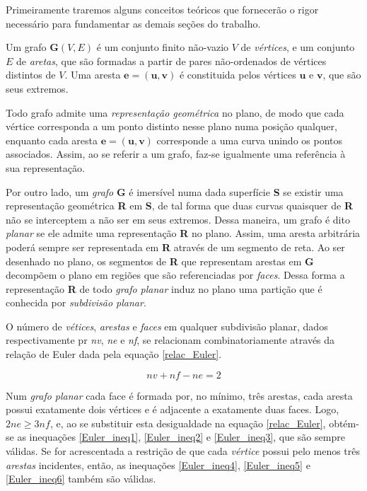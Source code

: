 \documentclass[12pt,a4paper]{book}
\begin{document}
Primeiramente traremos alguns conceitos te\'oricos que fornecer\~ao o rigor necess\'ario para fundamentar as demais se\c{c}\~{o}es do trabalho.

Um grafo ${\mathbf G}(V, E)$ \'e um conjunto finito n\~ao-vazio $V$ de \textit{v\'ertices}, e um conjunto $E$ de \textit{aretas}, que s\~ao formadas a partir de pares n\~ao-ordenados de v\'ertices distintos de $V$. Uma aresta $\mathbf{e}=(\mathbf{u}, \mathbf{v})$ \'e constituida pelos v\'ertices $\mathbf{u}$ e $\mathbf{v}$, que s\~ao seus extremos.

Todo grafo admite uma \textit{representa\c{c}\~{a}o geom\'etrica} no plano, de modo que cada v\'ertice corresponda a um ponto distinto nesse plano numa posi\c{c}\~{a}o qualquer, enquanto cada aresta $\mathbf{e}=(\mathbf{u}, \mathbf{v})$ corresponde a uma curva unindo os pontos associados. Assim, ao se referir a um grafo, faz-se igualmente uma refer\^encia \`a sua representa\c{c}\~{a}o.

Por outro lado, um \textit{grafo} \textbf{G} \'e imers\'ivel numa dada superf\'icie \textbf{S} se existir uma representa\c{c}\~{a}o geom\'etrica \textbf{R} em \textbf{S}, de tal forma que duas curvas quaisquer de \textbf{R} n\~ao se interceptem a n\~ao ser em seus extremos. Dessa maneira, um grafo \'e dito \textit{planar} se ele admite uma representa\c{c}\~{a}o \textbf{R} no plano. Assim, uma aresta arbitr\'aria poder\'a sempre ser representada em \textbf{R} atrav\'es de um segmento de reta. Ao ser desenhado no plano, os segmentos de \textbf{R} que representam arestas em \textbf{G} decomp\~oem o plano em regi\~oes que s\~ao referenciadas por \textit{faces}. Dessa forma a representa\c{c}\~{a}o \textbf{R} de todo \textit{grafo planar} induz no plano  uma parti\c{c}\~{a}o que \'e conhecida por \textit{subdivis\~ao planar}.

O n\'umero de \textit{v\'etices}, \textit{arestas} e \textit{faces} em qualquer subdivis\~ao planar, dados respectivamente pr \textit{nv}, \textit{ne} e \textit{nf}, se relacionam combinatoriamente atrav\'es da rela\c{c}\~{a}o de Euler dada pela equa\c{c}\~{a}o \ref{relac_Euler}.

\begin{equation} \label{relac_Euler}
nv+nf-ne = 2
\end{equation}

Num \textit{grafo planar} cada face \'e formada por, no m\'inimo, tr\^es arestas, cada aresta possui exatamente dois v\'ertices e \'e adjacente a exatamente duas faces. Logo, $2ne\geq 3nf$, e, ao se substituir esta desigualdade na equa\c{c}\~{a}o \ref{relac_Euler}, obt\'em-se as inequa\c{c}\~{o}es \ref{Euler_ineq1}, \ref{Euler_ineq2} e \ref{Euler_ineq3}, que s\~ao sempre v\'alidas. Se for acrescentada a restri\c{c}\~{a}o de que cada \textit{v\'ertice} possui pelo menos tr\^es \textit{arestas} incidentes, ent\~ao, as inequa\c{c}\~{o}es \ref{Euler_ineq4}, \ref{Euler_ineq5} e \ref{Euler_ineq6} tamb\'em s\~ao v\'alidas.
\end{document}
